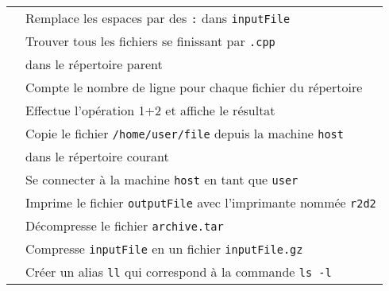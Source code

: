 \documentclass [a4paper]{article}
\begin{document}
\begin{tabular}{ ll }
\hspace{0.5cm}{\verb+cat inputFile | tr " " ":"+}         & Remplace les espaces par des \verb+:+ dans \verb+inputFile+\\
\hspace{0.5cm}{\verb+find -name "*.cpp" ../+}             & Trouver tous les fichiers se finissant par \verb+.cpp+\\
                                                          & dans le répertoire parent\\
\hspace{0.5cm}{\verb+wc -l *+}                            & Compte le nombre de ligne pour chaque fichier du répertoire\\
\hspace{0.5cm}{\verb?bc <<< "1+2"?}                       & Effectue l'opération 1+2 et affiche le résultat\\
\hspace{0.5cm}{\verb?scp user@host:/home/user/file ./?}   & Copie le fichier \verb+/home/user/file+ depuis la machine \verb+host+ \\
                                                          & dans le répertoire courant \\
\hspace{0.5cm}{\verb?ssh user@host?}                      & Se connecter à la machine \verb+host+ en tant que \verb+user+\\
\hspace{0.5cm}{\verb?lpr -Pr2d2 outputFile?}              & Imprime le fichier \verb+outputFile+ avec l'imprimante nommée \verb+r2d2+\\
\hspace{0.5cm}{\verb?tar -xvf archive.tar?}               & Décompresse le fichier \verb+archive.tar+\\
\hspace{0.5cm}{\verb?gzip inputFile?}                     & Compresse \verb+inputFile+ en un fichier \verb+inputFile.gz+\\
\hspace{0.5cm}{\verb?alias ll='ls -l'?}                   & Créer un alias \verb+ll+ qui correspond à la commande \verb+ls -l+\\

\hline
\end{tabular}
\end{document}
